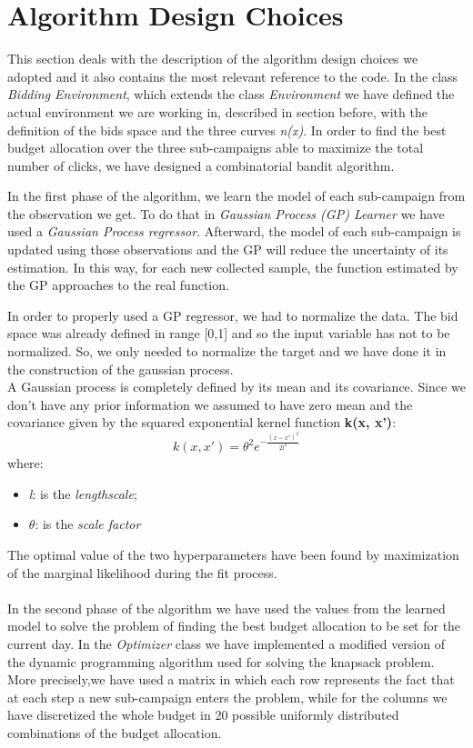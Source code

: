 \section{Algorithm Design Choices}

This section deals with the description of the algorithm design choices we adopted and
it also contains the most relevant reference to the code.
In the class \textit{Bidding Environment}, which extends the class \textit{Environment} we have defined the actual environment we are working in, described in section before, with the definition of the bids space and the three curves \textit{n(x)}.
In order to find the best budget allocation over the three sub-campaigns able to maximize the total number of clicks, we have designed a combinatorial bandit algorithm.

In the first phase of the algorithm, we learn the model of each sub-campaign from the observation we get.
To do that in \textit{Gaussian Process (GP) Learner} we have used a \textit{Gaussian Process regressor}.
Afterward, the model of each sub-campaign is updated using those observations and the GP will reduce the uncertainty of its estimation.
In this way, for each new collected sample, the function estimated by the GP approaches to the real function.


In order to properly used a GP regressor, we had to normalize the data. The bid space was already defined in range [0,1] and so the input variable has not to be normalized. So, we only needed to normalize the target and we have done it in the construction of the gaussian process.\\
A Gaussian process is completely defined by its mean and its covariance. Since we don't have any prior information we assumed to have zero mean and the covariance given by the squared exponential kernel function \textbf{k(x, x')}:
\begin{equation}
	k(x,x') = \theta^{2} e^{-\frac{(x-x')^2}{2 l^2}}
\end{equation}
where:
\begin{itemize}
	\item \textit{l}: is the \textit{lengthscale};
	\item $\theta$: is the \textit{scale factor}
\end{itemize}
The optimal value of the two hyperparameters have been found by maximization of the marginal likelihood during the fit process.
\\
\\
In the second phase of the algorithm we have used the values from the learned model to solve the problem of finding the best budget allocation to be set for the current day.
In the \textit{Optimizer} class we have implemented a modified version of the dynamic programming algorithm used for solving the knapsack problem.
More precisely,we have used a matrix in which each row represents the fact that at each step a new sub-campaign enters the problem, while for the columns we have discretized the whole budget in 20 possible uniformly distributed combinations of the budget allocation.

